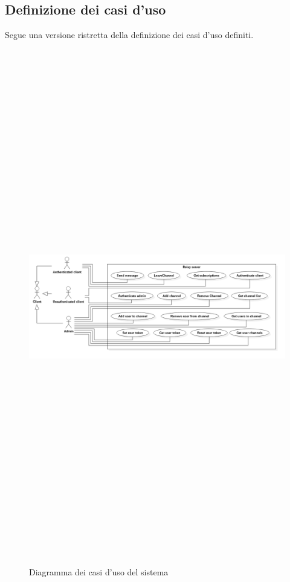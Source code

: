 	\subsection{Definizione dei casi d'uso}
		Segue una versione ristretta della definizione dei casi d'uso definiti.
		\begin{figure}[H]
			\begin{center}
			\includegraphics[width=16.5cm,height=22.5cm,keepaspectratio]{UML/png/Use Case Model__Use Cases_0}
			\caption{Diagramma dei casi d'uso del sistema}
			\end{center}
		\end{figure}

